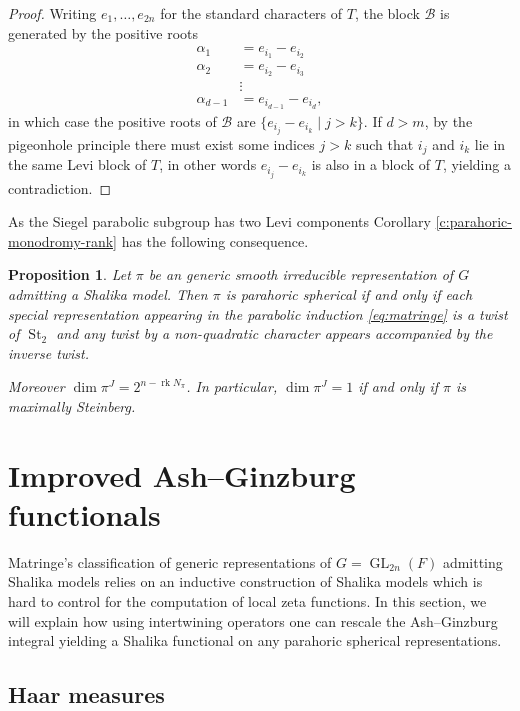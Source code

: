 \documentclass{amsart}
\newtheorem{proposition}[thm]{Proposition}
\theoremstyle{definition}
\newcommand{\rk}{\operatorname{rk}}
\newcommand{\St}{\operatorname{St}}
\newcommand{\GL}{\operatorname{GL}}
\begin{document}
{\begin{proof}
Writing $e_1,\ldots,e_{2n}$ for the standard characters of $T$,
the block $\mathcal{B}$ is generated by the positive roots
\begin{align*}
  \alpha_1&=e_{i_1}-e_{i_2}\\
  \alpha_2&=e_{i_2}-e_{i_3}\\
          &\vdots\\
  \alpha_{d-1}&=e_{i_{d-1}}-e_{i_d},
\end{align*}
in which case the positive roots of $\mathcal{B}$ are $\{e_{i_j}-e_{i_k}\mid j>k\}$. If $d>m$, by the pigeonhole principle there must exist some indices $j>k$ such that $i_j$ and $i_k$ lie in the same Levi block of $T$, in other words $e_{i_j}-e_{i_k}$ is also in a block of $T$, yielding a contradiction.
\end{proof}

As the Siegel parabolic subgroup has two Levi components Corollary \ref{c:parahoric-monodromy-rank} has the following consequence. 

\begin{proposition}\label{p:parahoric-rank2}
Let $\pi$ be an generic  smooth irreducible representation of $G$ admitting a Shalika model. Then $\pi$ is parahoric spherical if and only if 
each special representation appearing in the parabolic induction \eqref{eq:matringe} is a twist of $\St_2$ and any twist by a non-quadratic character 
appears accompanied by the inverse twist. 

Moreover $\dim\pi^J=2^{n-\rk N_{\pi}}$. In particular, $\dim\pi^J=1$ if and only if $\pi$ is maximally Steinberg.
\end{proposition}




\section{Improved  Ash--Ginzburg functionals}\label{s:intertwining}


Matringe's classification of generic representations of $G=\GL_{2n}(F)$ admitting Shalika models relies on an inductive
construction of Shalika models which is hard to control for the computation of local zeta functions. In this section, we
will explain how  using intertwining operators one can rescale the Ash--Ginzburg integral yielding a Shalika functional on any parahoric spherical representations.



\subsection*{Haar measures}

}
\end{document}
